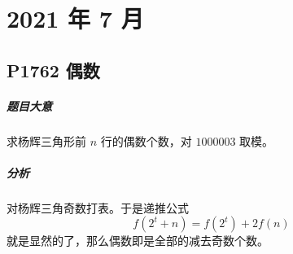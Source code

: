 \chapter{2021 年 7 月}

\section{P1762 偶数}

\paragraph{题目大意}

求杨辉三角形前 $n$ 行的偶数个数，对 $1000003$ 取模。

\paragraph{分析}

对杨辉三角奇数打表。于是递推公式
\[ f(2^t+n) = f(2^t) + 2f(n) \]
就是显然的了，那么偶数即是全部的减去奇数个数。


